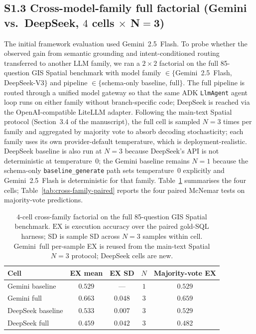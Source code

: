 \documentclass[11pt]{article}
\begin{document}
\subsection*{S1.3 Cross-model-family full factorial (Gemini vs.\ DeepSeek, $4$ cells $\times$ N$=$3)}

The initial framework evaluation used Gemini~2.5~Flash. To probe whether the observed gain
from semantic grounding and intent-conditioned routing transferred to another LLM
family, we ran a $2{\times}2$ factorial on the full 85-question GIS Spatial
benchmark with model family $\in\{$Gemini~2.5~Flash, DeepSeek-V3$\}$ and
pipeline $\in\{$schema-only baseline, full$\}$. The full pipeline is routed
through a unified model gateway so that the same ADK \texttt{LlmAgent} agent
loop runs on either family without branch-specific code; DeepSeek is reached
via the OpenAI-compatible LiteLLM adapter. Following the main-text Spatial
protocol (Section~3.4 of the manuscript), the full cell is sampled $N{=}3$
times per family and aggregated by majority vote to absorb decoding
stochasticity; each family uses its own provider-default temperature, which
is deployment-realistic. DeepSeek baseline is also run at $N{=}3$ because
DeepSeek's API is not deterministic at temperature~$0$; the Gemini baseline
remains $N{=}1$ because the schema-only \texttt{baseline\_generate} path sets
temperature~$0$ explicitly and Gemini~2.5~Flash is deterministic for that
family. Table~\ref{tab:cross-family-4cell} summarises the four cells;
Table~\ref{tab:cross-family-paired} reports the four paired McNemar tests on
majority-vote predictions.

\begin{table}[h]
\centering
\caption{$4$-cell cross-family factorial on the full 85-question GIS Spatial
benchmark. $\mathrm{EX}$ is execution accuracy over the paired gold-SQL
harness; SD is sample SD across $N=3$ samples within cell. Gemini~full
per-sample EX is reused from the main-text Spatial $N=3$ protocol;
DeepSeek cells are new.}
\label{tab:cross-family-4cell}
\begin{tabular}{lcccc}
\toprule
Cell & EX mean & EX SD & $N$ & Majority-vote EX \\
\midrule
Gemini baseline   & $0.529$ & ---      & $1$ & $0.529$ \\
Gemini full       & $0.663$ & $0.048$  & $3$ & $0.659$ \\
DeepSeek baseline & $0.533$ & $0.007$  & $3$ & $0.529$ \\
DeepSeek full     & $0.459$ & $0.042$  & $3$ & $0.482$ \\
\bottomrule
\end{tabular}
\end{table}
\end{document}
